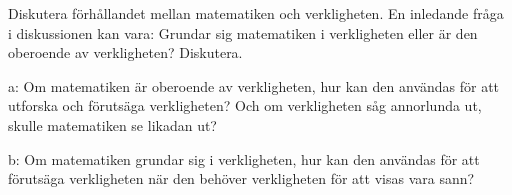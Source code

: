 \begin{exercise}
  Diskutera förhållandet mellan matematiken och verkligheten.
  En inledande fråga i diskussionen kan vara:
  Grundar sig matematiken i verkligheten eller är den oberoende av
  verkligheten?
  Diskutera.
\end{exercise}

\begin{exercise}
  a: Om matematiken är oberoende av verkligheten, hur kan den användas
  för att utforska och förutsäga verkligheten? Och om verkligheten såg
  annorlunda ut, skulle matematiken se likadan ut?

  b: Om matematiken grundar sig i verkligheten, hur kan den användas för att
  förutsäga verkligheten när den behöver verkligheten för att visas vara sann?
\end{exercise}

